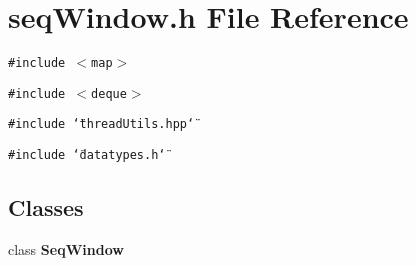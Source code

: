 \section{seq\-Window.h File Reference}
\label{seqWindow_8h}
{\tt \#include $<$map$>$}\par
{\tt \#include $<$deque$>$}\par
{\tt \#include \char`\"{}thread\-Utils.hpp\char`\"{}}\par
{\tt \#include \char`\"{}datatypes.h\char`\"{}}\par
\subsection*{Classes}
\begin{CompactItemize}
\item 
class {\bf Seq\-Window}
\end{CompactItemize}
